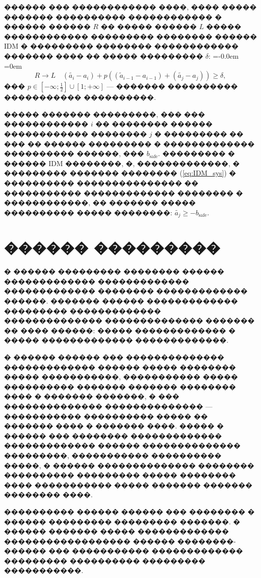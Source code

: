 \documentclass[11pt]{ubs}
\begin{document}
������ ��� ������������ ����, ���� ����� ������� ����������  ������������  � ������ ������ $R$ �� ����� ������ $L$ ����� ������������  ���������  �������� ������ IDM � ��������� �������� ������������ ������� ���� �� ����� ��������� $\delta$:
{
\abovedisplayskip=-0.0em
\belowdisplayskip=0em
$$
  R\to L \quad \left(\widetilde{a_i}-a_i \right) + p\left((\widetilde{a}_{i-1}-a_{i-1})  + (\widetilde{a_j}-a_j)  \right) \geqslant \delta,
$$ }
���  $p \in \left[ -\infty;\frac{1}{2}\right]\cup  \left[1; +\infty\right]$ ---  ������� ���������� ����������� ����������.

����� ������� ���������, ��� ��� ������������ $i$ �� �������� ������ ������������ �������� $j$ � ��������� �� ��� �� ������ ��������� � ������������� ���������� ������, ��� $b_{\mathrm{safe}}.$ ��������� � ������ IDM ��������, �, �������������, � ��������� ������� ��������   (\ref{eq:IDM_sys}) � ���������� ��������������� �� ����������� ������������� �������� � ������������, �� ������� ����� ���������� ����� ��������:
$
  \widetilde{a_j} \geqslant -b_{\mathrm{safe}}.
$

\section{������ ���������}
\label{par:MARLIN24_val}

� ������ ���������  �������� ������ ������������� ������������� ������������� �������� ������������� ������.
������� ������ ������������� ��������� ������������� �������������� �������������� ������� �� ���� ������: ����� ������������� � ����� ������������� �������������.

� ������ ������ ��� �������������� ������������� ������ ����� �������� ����� �����������, ����������� ����� ���������� ������� ������� �������� ���� � ������� �������, � ��� �������������� �������������� --- ����������� ���������� ����� �� ������� ���� � ������� ����.
����� � ������ \cite{OMSK} ��� �������� ������������� ������������� ������ �������������� ���������, ����������� ���������� �����,
� ������  \cite{TOMSK}  �������������� �������� ���������� ��������� ����� �������� ���� ����������� ����� ������� ������� �������� ����.



���������� ������ ������ ��� �������� � ������ ��������� ��������� �������.
� ������ ������� ����� ������������� ������������������ ������ ������\-��-������ \cite{marshall1996copulas}  ���  ����������� ������������� ��������� ���������� ��������� �����������.
\end{document}
